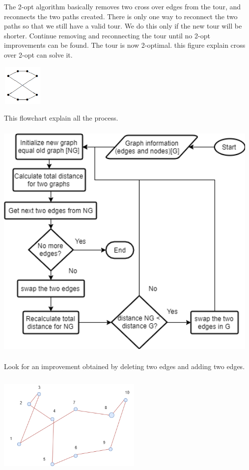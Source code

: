 \documentclass[12pt]{article}
\newcounter{subsubsubsection}[subsubsection]
\begin{document}
The 2-opt algorithm basically removes two cross over edges
from the tour, and reconnects the two paths created.
There is only one way to reconnect the two paths so that we still
have a valid tour. We do this only if the
new tour will be shorter. Continue removing and reconnecting
the tour until no 2-opt improvements can
be found. The tour is now 2-optimal. this figure explain cross over 2-opt can solve it.
\begin{center}
	\includegraphics[width=2cm,height=2cm]{./assets/example/graph-2opt-1.png}
\end{center}
This flowchart explain all the process.
\begin{center}
	\includegraphics[width=13cm,height=12cm]{./assets/flowchart/2-opt.png}
\end{center}
Look for an improvement obtained by deleting two edges and adding two edges.
\begin{center}
	\includegraphics[width=7cm,height=5cm]{./assets/example/2-opt-1.png}
\end{center}
\end{document}
